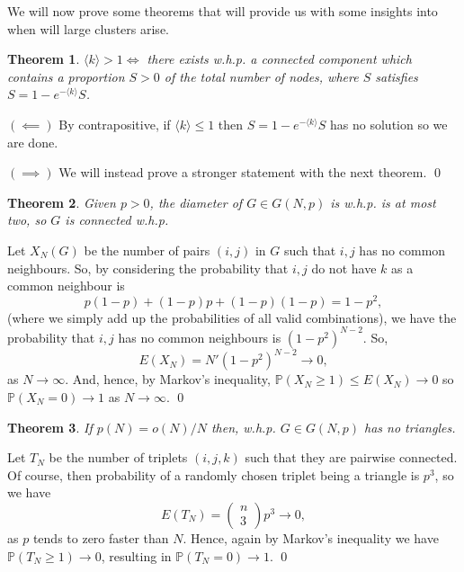 \documentclass[
]{article}
\newtheorem{theorem}{Theorem}
\theoremstyle{definition}
\begin{document}
We will now prove some theorems that will provide us with some insights
into when will large clusters arise.

\begin{theorem}
  \(\langle k \rangle > 1 \iff\) there exists w.h.p. a connected component which 
  contains a proportion \(S > 0\) of the total number of nodes, where \(S\) 
  satisfies \(S = 1 - e^{-\langle k \rangle}S\).
\end{theorem}
\proof

\((\impliedby)\) By contrapositive, if \(\langle k \rangle \le 1\) then
\(S = 1 - e^{-\langle k \rangle}S\) has no solution so we are done.

\((\implies)\) We will instead prove a stronger statement with the next
theorem. \qed

\begin{theorem}
  Given \(p > 0\), the diameter of \(G \in G(N, p)\) is w.h.p. is at most two, 
  so \(G\) is connected w.h.p.
\end{theorem}
\proof

Let \(X_N(G)\) be the number of pairs \((i, j)\) in \(G\) such that
\(i, j\) has no common neighbours. So, by considering the probability
that \(i, j\) do not have \(k\) as a common neighbour is
\[ p(1 - p) + (1 - p)p + (1- p)(1 - p) = 1 - p^2,\] (where we simply add
up the probabilities of all valid combinations), we have the probability
that \(i ,j\) has no common neighbours is \((1 - p^2)^{N - 2}\). So,
\[E(X_N) = N'(1 - p^2)^{N - 2} \to 0,\] as \(N \to \infty\). And, hence,
by Markov's inequality, \(\mathbb{P}(X_N \ge 1) \le E(X_N) \to 0\) so
\(\mathbb{P}(X_N = 0) \to 1\) as \(N \to \infty\). \qed

\begin{theorem}
  If \(p(N) = o(N) / N\) then, w.h.p. \(G \in G(N, p)\) has no triangles.
\end{theorem}
\proof

Let \(T_N\) be the number of triplets \((i, j ,k)\) such that they are
pairwise connected. Of course, then probability of a randomly chosen
triplet being a triangle is \(p^3\), so we have
\[E(T_N) = \begin{pmatrix} n \\ 3 \end{pmatrix} p^3 \to 0,\] as \(p\)
tends to zero faster than \(N\). Hence, again by Markov's inequality we
have \(\mathbb{P}(T_N \ge 1) \to 0\), resulting in
\(\mathbb{P}(T_N = 0) \to 1\). \qed
\end{document}
